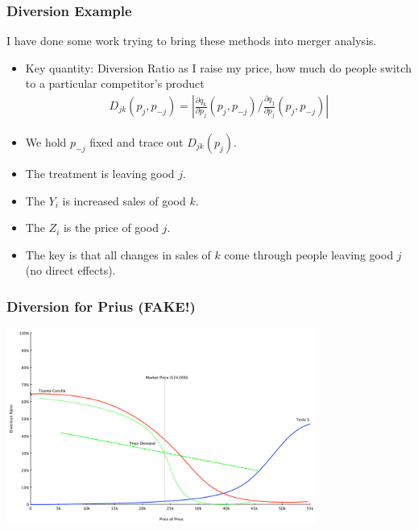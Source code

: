 \begin{frame}
\frametitle{Diversion Example}
I have done some work trying to bring these methods into merger analysis.
\begin{itemize}
\item Key quantity: \alert{Diversion Ratio} as I raise my price, how much do people switch to a particular competitor's product
\begin{eqnarray*}
D_{jk}(p_j,p_{-j}) = \left| \frac{\partial q_k}{\partial p_j}(p_j,p_{-j}) /  \frac{\partial q_j}{\partial p_j}(p_j,p_{-j}) \right|
\end{eqnarray*}
\item We hold $p_{-j}$ fixed and trace out $D_{jk}(p_j)$.
\item The \alert{treatment} is leaving good $j$.
\item The $Y_i$ is increased sales of good $k$.
\item The $Z_i$ is the price of good $j$.
\item The key is that all changes in sales of $k$ come through people leaving good $j$ (no direct effects).
\end{itemize}
\end{frame}

\begin{frame}
\frametitle{Diversion for Prius (FAKE!)}
\begin{center}
\includegraphics[width=4in]{./resources/sillydiversion.pdf}
\end{center}
\end{frame}

